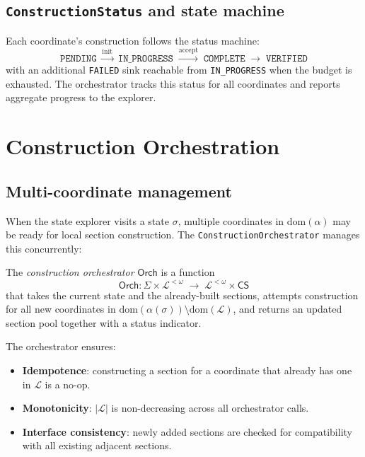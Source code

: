 \documentclass[11pt]{article}
\newcommand{\St}{\Sigma}                      %
\newcommand{\state}{\sigma}                   %
\newcommand{\LocSecs}{\mathcal{L}}            %
\newcommand{\Orch}{\mathsf{Orch}}             %
\newcommand{\CStatus}{\mathsf{CS}}            %
\begin{document}
\subsection{\texttt{ConstructionStatus} and state machine}

Each coordinate's construction follows the status machine:
\[
  \texttt{PENDING}
  \;\xrightarrow{\text{init}}\;
  \texttt{IN\_PROGRESS}
  \;\xrightarrow{\text{accept}}\;
  \texttt{COMPLETE}
  \;\xrightarrow{}\;
  \texttt{VERIFIED}
\]
with an additional \texttt{FAILED} sink reachable from
\texttt{IN\_PROGRESS} when the budget is exhausted.  The orchestrator
tracks this status for all coordinates and reports aggregate progress
to the explorer.

\section{Construction Orchestration}\label{sec:orchestration}

\subsection{Multi-coordinate management}

When the state explorer visits a state $\state$, multiple coordinates
in $\mathrm{dom}(\alpha)$ may be ready for local section construction.
The \texttt{ConstructionOrchestrator} manages this concurrently:

\begin{definition}[Orchestrator]\label{def:orch}
The \emph{construction orchestrator} $\Orch$ is a function
\[
  \Orch\colon
  \St \times \LocSecs^{<\omega}
  \;\longrightarrow\;
  \LocSecs^{<\omega} \times \CStatus
\]
that takes the current state and the already-built sections, attempts
construction for all new coordinates in $\mathrm{dom}(\alpha(\state))
\setminus \mathrm{dom}(\mathcal{L})$, and returns an updated section
pool together with a status indicator.
\end{definition}

The orchestrator ensures:
\begin{itemize}
  \item \textbf{Idempotence}: constructing a section for a coordinate
    that already has one in $\mathcal{L}$ is a no-op.
  \item \textbf{Monotonicity}: $|\mathcal{L}|$ is non-decreasing across
    all orchestrator calls.
  \item \textbf{Interface consistency}: newly added sections are
    checked for compatibility with all existing adjacent sections.
\end{itemize}
\end{document}
